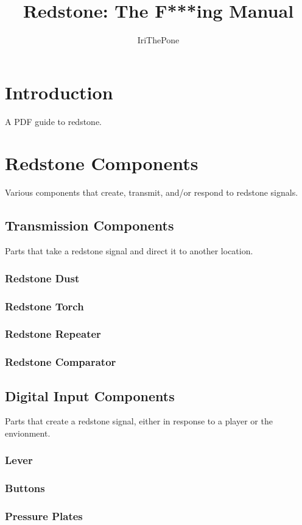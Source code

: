 \documentclass[12pt]{article}
\title{Redstone: The F***ing Manual}
\author{IriThePone}
\begin{document}
\maketitle
\pagebreak
\tableofcontents
\pagebreak

\section{Introduction}
A PDF guide to redstone.
\pagebreak

\section{Redstone Components}
Various components that create, transmit, and/or respond to redstone signals.  
\subsection{Transmission Components}
Parts that take a redstone signal and direct it to another location.
\subsubsection{Redstone Dust}
\subsubsection{Redstone Torch}
\subsubsection{Redstone Repeater}
\subsubsection{Redstone Comparator}

\pagebreak

\subsection{Digital Input Components}
Parts that create a redstone signal, either in response to a player or the envionment.
\subsubsection{Lever}
\subsubsection{Buttons}
\subsubsection{Pressure Plates}
\end{document}

